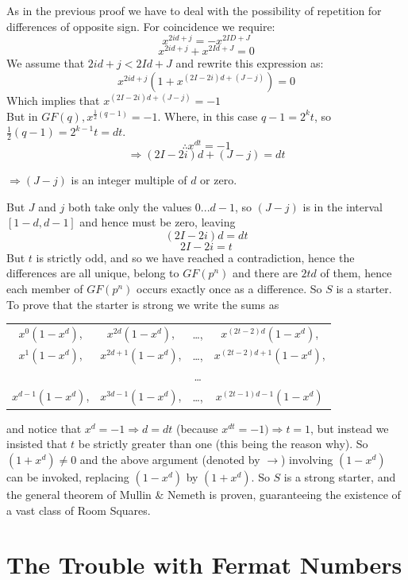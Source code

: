 \documentclass[
  12pt,
  a4paper]{book}
\begin{document}
As in the previous proof we have to deal with the possibility of
repetition for differences of opposite sign. For coincidence we require:
\[x^{2id+j}=-x^{2ID+J}\] \[x^{2id+j}+x^{2Id+J}=0\] We assume that
\(2id+j<2Id+J\) and rewrite this expression as:
\[x^{2id+j}(1+x^{(2I-2i)d+(J-j)})=0\] Which implies that
\(x^{(2I-2i)d+(J-j)}=-1\)\\
But in \(GF(q),x^{\frac{1}{2}(q-1)}=-1\). Where, in this case
\(q-1=2^kt\), so \(\frac{1}{2}(q-1)=2^{k-1}t=dt\).
\[\therefore x^{dt} = -1\] \[\Rightarrow (2I-2i)d+(J-j)=dt\]

\(\Rightarrow (J-j)\) is an integer multiple of \(d\) or zero.

But \(J\) and \(j\) both take only the values \(0...d-1\), so \((J-j)\)
is in the interval \([1-d,d-1]\) and hence must be zero, leaving
\[(2I-2i)d=dt\] \[2I-2i=t\] But \(t\) is strictly odd, and so we have
reached a contradiction, hence the differences are all unique, belong to
\(GF(p^n)\) and there are \(2td\) of them, hence each member of
\(GF(p^n)\) occurs exactly once as a difference. So \(S\) is a
starter.\\
To prove that the starter is strong we write the sums as

\begin{longtable}[]{@{}cccc@{}}
\toprule
\endhead
\(x^0(1-x^d)\), & \(x^{2d}(1-x^d)\), & \ldots, &
\(x^{(2t-2)d}(1-x^d)\),\tabularnewline
\(x^1(1-x^d)\), & \(x^{2d+1}(1-x^d)\), & \ldots, &
\(x^{(2t-2)d+1}(1-x^d)\),\tabularnewline
& & \ldots{} &\tabularnewline
\(x^{d-1}(1-x^d)\), & \(x^{3d-1}(1-x^d)\), & \ldots, &
\(x^{(2t-1)d-1}(1-x^d)\)\tabularnewline
\bottomrule
\end{longtable}

and notice that \(x^d=-1 \Rightarrow d=dt\) (because
\(x^{dt}=-1) \Rightarrow t=1\), but instead we insisted that \(t\) be
strictly greater than one (this being the reason why). So
\((1+x^d) \neq 0\) and the above argument (denoted by \(\rightarrow\))
involving \((1-x^d)\) can be invoked, replacing \((1-x^d)\) by
\((1+x^d)\). So \(S\) is a strong starter, and the general theorem of
Mullin \& Nemeth is proven, guaranteeing the existence of a vast class
of Room Squares.

\hypertarget{the-trouble-with-fermat-numbers}{%
\section{The Trouble with Fermat
Numbers}\label{the-trouble-with-fermat-numbers}}
\end{document}
